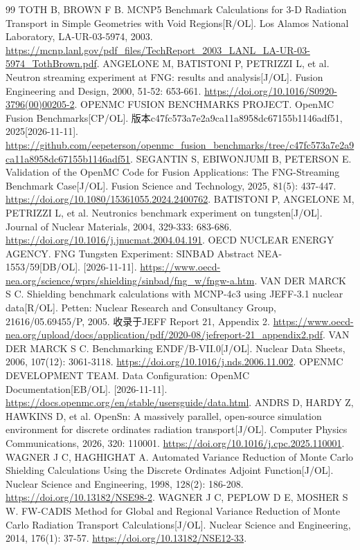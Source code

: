 \documentclass[UTF8, zihao=-4, fontset=none, a4paper]{ctexart}
\begin{document}
\begin{thebibliography}{99}
TOTH B, BROWN F B. MCNP5 Benchmark Calculations for 3-D Radiation Transport in Simple Geometries with Void Regions{[}R/OL{]}. Los Alamos National Laboratory, LA-UR-03-5974, 2003. \url{https://mcnp.lanl.gov/pdf_files/TechReport_2003_LANL_LA-UR-03-5974_TothBrown.pdf}.
ANGELONE M, BATISTONI P, PETRIZZI L, et al. Neutron streaming experiment at FNG: results and analysis{[}J/OL{]}. Fusion Engineering and Design, 2000, 51-52: 653-661. \url{https://doi.org/10.1016/S0920-3796(00)00205-2}.
OPENMC FUSION BENCHMARKS PROJECT. OpenMC Fusion Benchmarks{[}CP/OL{]}. 版本c47fc573a7e2a9ca11a8958dc67155b1146adf51, 2025[2026-11-11]. \url{https://github.com/eepeterson/openmc_fusion_benchmarks/tree/c47fc573a7e2a9ca11a8958dc67155b1146adf51}.
SEGANTIN S, EBIWONJUMI B, PETERSON E. Validation of the OpenMC Code for Fusion Applications: The FNG-Streaming Benchmark Case{[}J/OL{]}. Fusion Science and Technology, 2025, 81(5): 437-447. \url{https://doi.org/10.1080/15361055.2024.2400762}.
BATISTONI P, ANGELONE M, PETRIZZI L, et al. Neutronics benchmark experiment on tungsten{[}J/OL{]}. Journal of Nuclear Materials, 2004, 329-333: 683-686. \url{https://doi.org/10.1016/j.jnucmat.2004.04.191}.
OECD NUCLEAR ENERGY AGENCY. FNG Tungsten Experiment: SINBAD Abstract NEA-1553/59{[}DB/OL{]}. [2026-11-11]. \url{https://www.oecd-nea.org/science/wprs/shielding/sinbad/fng_w/fngw-a.htm}.
VAN DER MARCK S C. Shielding benchmark calculations with MCNP-4c3 using JEFF-3.1 nuclear data{[}R/OL{]}. Petten: Nuclear Research and Consultancy Group, 21616/05.69455/P, 2005. 收录于JEFF Report 21, Appendix 2. \url{https://www.oecd-nea.org/upload/docs/application/pdf/2020-08/jefreport-21_appendix2.pdf}.
VAN DER MARCK S C. Benchmarking ENDF/B-VII.0{[}J/OL{]}. Nuclear Data Sheets, 2006, 107(12): 3061-3118. \url{https://doi.org/10.1016/j.nds.2006.11.002}.
OPENMC DEVELOPMENT TEAM. Data Configuration: OpenMC Documentation{[}EB/OL{]}. [2026-11-11]. \url{https://docs.openmc.org/en/stable/usersguide/data.html}.
ANDRS D, HARDY Z, HAWKINS D, et al. OpenSn: A massively parallel, open-source simulation environment for discrete ordinates radiation transport{[}J/OL{]}. Computer Physics Communications, 2026, 320: 110001. \url{https://doi.org/10.1016/j.cpc.2025.110001}.
WAGNER J C, HAGHIGHAT A. Automated Variance Reduction of Monte Carlo Shielding Calculations Using the Discrete Ordinates Adjoint Function{[}J/OL{]}. Nuclear Science and Engineering, 1998, 128(2): 186-208. \url{https://doi.org/10.13182/NSE98-2}.
WAGNER J C, PEPLOW D E, MOSHER S W. FW-CADIS Method for Global and Regional Variance Reduction of Monte Carlo Radiation Transport Calculations{[}J/OL{]}. Nuclear Science and Engineering, 2014, 176(1): 37-57. \url{https://doi.org/10.13182/NSE12-33}.
\end{thebibliography}
\end{document}
